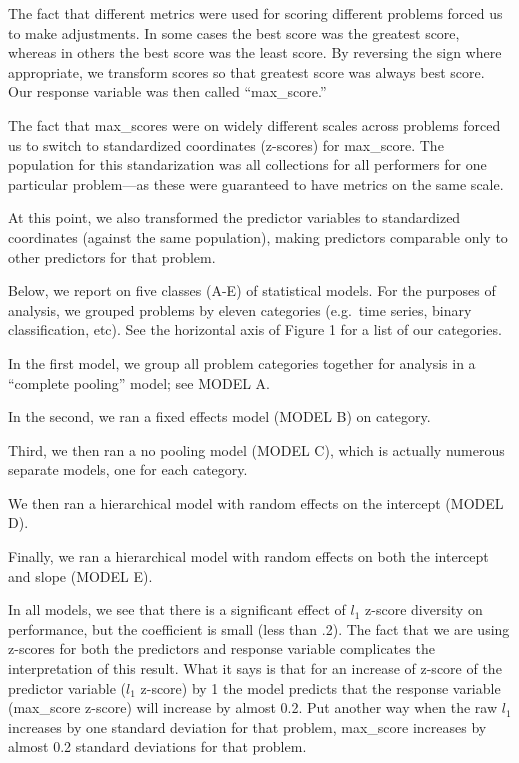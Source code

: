 \documentclass{article}
\begin{document}
The fact that different metrics were used for scoring different
problems forced us to make adjustments.  In some cases the best score
was the greatest score, whereas in others the best score was the least
score.  By reversing the sign where appropriate, we transform scores
so that greatest score was always best score.  Our response variable
was then called ``max\_score.''

The fact that max\_scores were on widely different scales across
problems forced us to switch to standardized coordinates (z-scores)
for max\_score.  The population for this standarization was all
collections for all performers for one particular problem---as these
were guaranteed to have metrics on the same scale.

At this point, we also transformed the predictor variables to
standardized coordinates (against the same population), making
predictors comparable only to other predictors for that problem.

Below, we report on five classes (A-E) of statistical models.  For the
purposes of analysis, we grouped problems by eleven categories
(e.g.\ time series, binary classification, etc).  See the horizontal
axis of Figure 1 for a list of our categories.

In the first model, we group all problem categories together for
analysis in a ``complete pooling'' model; see MODEL A.


In the second, we ran a fixed effects model (MODEL B) on category.

Third, we then ran a no pooling model (MODEL C), which is actually
numerous separate models, one for each category.

We then ran a hierarchical model with random effects on the intercept
(MODEL D).

Finally, we ran a hierarchical model with random effects on both the
intercept and slope (MODEL E).

In all models, we see that there is a significant effect of $l_1$
z-score diversity on performance, but the coefficient is small (less
than .2).  The fact that we are using z-scores for both the predictors
and response variable complicates the interpretation of this result.
What it says is that for an increase of z-score of the predictor
variable ($l_1$ z-score) by 1 the model predicts that the response
variable (max\_score z-score) will increase by almost 0.2.  Put
another way when the raw $l_1$ increases by one standard deviation for
that problem, max\_score increases by almost 0.2 standard deviations
for that problem.
\end{document}
